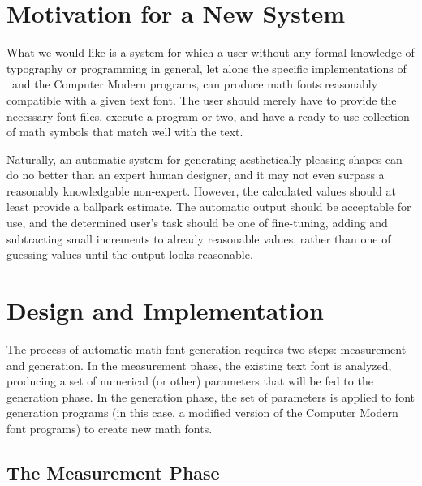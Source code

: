 \documentclass[preprint]{ltugproc}
\begin{document}
\section{Motivation for a New System}

What we would like is a system for which a user without any formal knowledge of
typography or programming in general, let alone the specific implementations of
\MF\ and the Computer Modern programs, can produce math fonts reasonably
compatible with a given text font. The user should merely have to provide the
necessary font files, execute a program or two, and have a ready-to-use
collection of math symbols that match well with the text.

Naturally, an automatic system for generating aesthetically pleasing shapes can
do no better than an expert human designer, and it may not even surpass a
reasonably knowledgable non-expert. However, the calculated values should at
least provide a ballpark estimate. The automatic output should be acceptable for
use, and the determined user's task should be one of fine-tuning, adding and
subtracting small increments to already reasonable values, rather than one of
guessing values until the output looks reasonable.

\section{Design and Implementation}

The process of automatic math font generation requires two steps: measurement
and generation. In the measurement phase, the existing text font is analyzed,
producing a set of numerical (or other) parameters that will be fed to the
generation phase. In the generation phase, the set of parameters is applied to
font generation programs (in this case, a modified version of the Computer
Modern font programs) to create new math fonts.

\subsection{The Measurement Phase}
\end{document}
